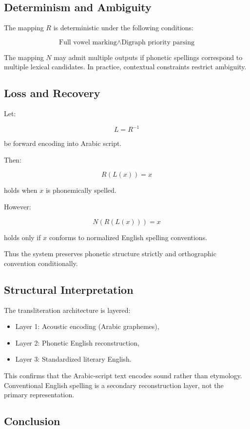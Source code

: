 \documentclass[12pt]{article}
\begin{document}
\subsection{Determinism and Ambiguity}

The mapping $R$ is deterministic under the following conditions:

\[
\text{Full vowel marking} \land \text{Digraph priority parsing}
\]

The mapping $N$ may admit multiple outputs if phonetic spellings correspond to multiple lexical candidates. In practice, contextual constraints restrict ambiguity.

\subsection{Loss and Recovery}

Let:

\[
L = R^{-1}
\]

be forward encoding into Arabic script.

Then:

\[
R(L(x)) = x
\]

holds when $x$ is phonemically spelled.

However:

\[
N(R(L(x))) = x
\]

holds only if $x$ conforms to normalized English spelling conventions.

Thus the system preserves phonetic structure strictly and orthographic convention conditionally.

\subsection{Structural Interpretation}

The transliteration architecture is layered:

\begin{itemize}
\item Layer 1: Acoustic encoding (Arabic graphemes),
\item Layer 2: Phonetic English reconstruction,
\item Layer 3: Standardized literary English.
\end{itemize}

This confirms that the Arabic-script text encodes sound rather than etymology. Conventional English spelling is a secondary reconstruction layer, not the primary representation.

\subsection{Conclusion}
\end{document}
